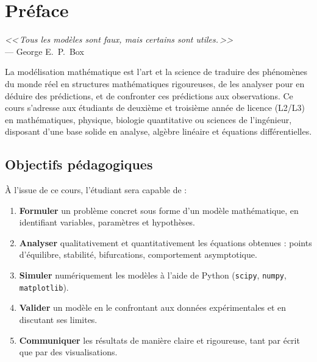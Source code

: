 \chapter*{Pr\'eface}

\begin{center}
\textit{<<\,Tous les mod\`eles sont faux, mais certains sont utiles.\,>>}\\[4pt]
--- George E.\ P.\ Box
\end{center}

\bigskip

La mod\'elisation math\'ematique est l'art et la science de traduire des ph\'enom\`enes
du monde r\'eel en structures math\'ematiques rigoureuses, de les analyser pour en
d\'eduire des pr\'edictions, et de confronter ces pr\'edictions aux observations.
Ce cours s'adresse aux \'etudiants de deuxi\`eme et troisi\`eme ann\'ee de licence
(L2/L3) en math\'ematiques, physique, biologie quantitative ou sciences de
l'ing\'enieur, disposant d'une base solide en analyse, alg\`ebre lin\'eaire
et \'equations diff\'erentielles.

\section*{Objectifs p\'edagogiques}

\`A l'issue de ce cours, l'\'etudiant sera capable de :

\begin{enumerate}
  \item \textbf{Formuler} un probl\`eme concret sous forme d'un mod\`ele
        math\'ematique, en identifiant variables, param\`etres et hypoth\`eses.
  \item \textbf{Analyser} qualitativement et quantitativement les \'equations
        obtenues : points d'\'equilibre, stabilit\'e, bifurcations,
        comportement asymptotique.
  \item \textbf{Simuler} num\'eriquement les mod\`eles \`a l'aide de Python
        (\texttt{scipy}, \texttt{numpy}, \texttt{matplotlib}).
  \item \textbf{Valider} un mod\`ele en le confrontant aux donn\'ees
        exp\'erimentales et en discutant ses limites.
  \item \textbf{Communiquer} les r\'esultats de mani\`ere claire et
        rigoureuse, tant par \'ecrit que par des visualisations.
\end{enumerate}

